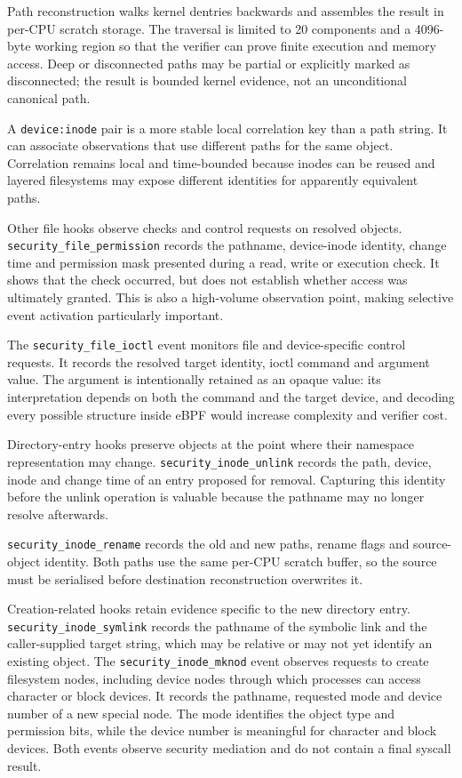 Path reconstruction walks kernel dentries backwards and assembles the result in
per-CPU scratch storage. The traversal is limited to 20 components and a
4096-byte working region so that the verifier can prove finite execution and
memory access. Deep or disconnected paths may be partial or explicitly marked
as disconnected; the result is bounded kernel evidence, not an unconditional
canonical path.

A \texttt{device:inode} pair is a more stable local correlation key than a path
string. It can associate observations that use different paths for the same
object. Correlation remains local and time-bounded because inodes can be reused
and layered filesystems may expose different identities for apparently
equivalent paths.

Other file hooks observe checks and control requests on resolved objects.
\texttt{security\_file\_permission} records the pathname,
device-inode identity, change time and permission mask presented during a
read, write or execution check. It shows that the check occurred, but does not
establish whether access was ultimately granted. This is also a high-volume
observation point, making selective event activation particularly important.

The \texttt{security\_file\_ioctl} event monitors file and device-specific
control requests. It records the resolved target identity, ioctl command and
argument value. The argument is intentionally retained as an opaque value:
its interpretation depends on both the command and the target device, and
decoding every possible structure inside eBPF would increase complexity and
verifier cost.

Directory-entry hooks preserve objects at the point where their namespace
representation may change. \texttt{security\_inode\_unlink} records the path,
device, inode and change time of an entry proposed for removal. Capturing this
identity before the unlink operation is valuable because the pathname may no
longer resolve afterwards.

\texttt{security\_inode\_rename} records the old and new paths, rename flags and
source-object identity. Both paths use the same per-CPU scratch buffer, so the
source must be serialised before destination reconstruction overwrites it.

Creation-related hooks retain evidence specific to the new directory entry.
\texttt{security\_inode\_symlink} records the pathname of the symbolic link and
the caller-supplied target string, which may be relative or may not yet identify
an existing object. The \texttt{security\_inode\_mknod} event observes requests to create
filesystem nodes, including device nodes through which processes can
access character or block devices. It records the pathname,
requested mode and device number of a new special node. The mode identifies the
object type and permission bits, while the device number is meaningful for
character and block devices. Both events observe security mediation and do not
contain a final syscall result.

